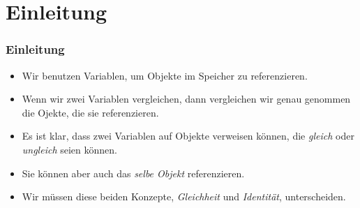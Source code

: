 \documentclass[aspectratio=169,mathserif,notheorems]{beamer}%
\subtitle{16.~Gleichheit und Identität}%
\begin{document}
%
%
\startPresentation%
%
\section{Einleitung}%
\begin{frame}%
\frametitle{Einleitung}%
\begin{itemize}%
\item Wir benutzen Variablen, um Objekte im Speicher zu referenzieren.%
\item<2-> Wenn wir zwei Variablen vergleichen, dann vergleichen wir genau genommen die Ojekte, die sie referenzieren.%
\item<3-> Es ist klar, dass zwei Variablen auf Objekte verweisen können, die \emph{gleich} oder \emph{ungleich} seien können.%
\item<4-> Sie können aber auch das \emph{selbe Objekt} referenzieren.%
\item<5-> Wir müssen diese beiden Konzepte, \emph{Gleichheit} und \emph{Identität}, unterscheiden.%
\end{itemize}%
\end{frame}%
%
\end{document}
